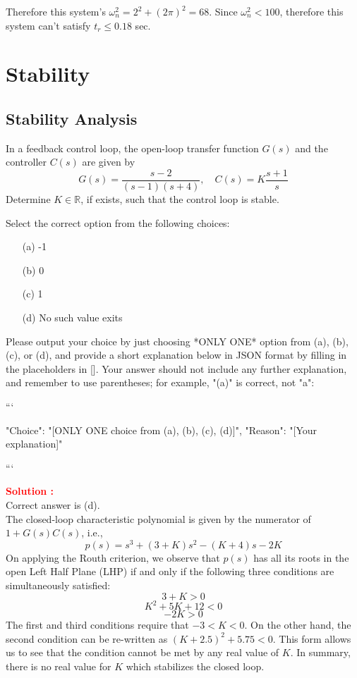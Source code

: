 \documentclass[12pt]{article}
\begin{document}
Therefore this system's $\omega_n^2 = 2^2 + (2 \pi)^2 =68$. Since $\omega_n^2 < 100$, therefore this system can't satisfy $t_r \leq 0.18$ sec.  
\clearpage

\section{Stability}
\subsection{Stability Analysis}
In a feedback control loop, the open-loop transfer function \(G(s)\) and the controller \(C(s)\) are given by
\begin{equation}
G(s) = \frac{s - 2}{(s - 1)(s + 4)}, \quad C(s) = K \frac{s + 1}{s}
\end{equation}
Determine \(K \in \mathbb{R}\), if exists, such that the control loop is stable.

Select the correct option from the following choices:
\begin{itemize}
    \item[(a)] -1
    \item[(b)] 0
    \item[(c)] 1
    \item[(d)] No such value exits
\end{itemize}

Please output your choice by just choosing *ONLY ONE* option from (a), (b), (c), or (d), and provide a short explanation below in JSON format by filling in the placeholders in []. Your answer should not include any further explanation, and remember to use parentheses; for example, "(a)" is correct, not "a":

```

{
"Choice": "[ONLY ONE choice from (a), (b), (c), (d)]",
"Reason": "[Your explanation]"
}

```

\textbf{\textcolor{red}{Solution :}} \\  
Correct answer is (d).\\
The closed-loop characteristic polynomial is given by the numerator of \(1 + G(s)C(s)\), i.e.,
\begin{equation}
p(s) = s^3 + (3 + K)s^2 - (K + 4)s - 2K
\end{equation}
On applying the Routh criterion, we observe that \(p(s)\) has all its roots in the open Left Half Plane (LHP) if and only if the following three conditions are simultaneously satisfied:
\begin{equation}
3 + K > 0
\end{equation}
\begin{equation}
K^2 + 5K + 12 < 0
\end{equation}
\begin{equation}
-2K > 0
\end{equation}
The first and third conditions require that \(-3 < K < 0\). On the other hand, the second condition can be re-written as \((K + 2.5)^2 + 5.75 < 0\). This form allows us to see that the condition cannot be met by any real value of \(K\). In summary, there is no real value for \(K\) which stabilizes the closed loop.
\clearpage
\end{document}
